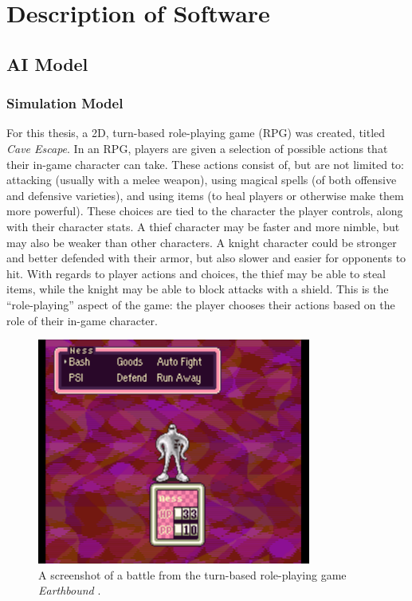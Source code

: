 \chapter{Description of Software}
\section{AI Model}
\subsection{Simulation Model}
For this thesis, a 2D, turn-based role-playing game (RPG) was created, titled \textit{Cave Escape}. In an RPG, players are given a selection of possible actions that their in-game character can take. These actions consist of, but are not limited to: attacking (usually with a melee weapon), using magical spells (of both offensive and defensive varieties), and using items (to heal players or otherwise make them more powerful). These choices are tied to the character the player controls, along with their character stats. A thief character may be faster and more nimble, but may also be weaker than other characters. A knight character could be stronger and better defended with their armor, but also slower and easier for opponents to hit. With regards to player actions and choices, the thief may be able to steal items, while the knight may be able to block attacks with a shield. This is the ``role-playing'' aspect of the game: the player chooses their actions based on the role of their in-game character.\\

\begin{figure}[H]
  \centering
  \includegraphics[width=9cm]{figures/Earthbound.png}
  \caption{A screenshot of a battle from the turn-based role-playing game \textit{Earthbound} \cite{earthbound94}.}
  \label{fig:Earthbound}
\end{figure}

